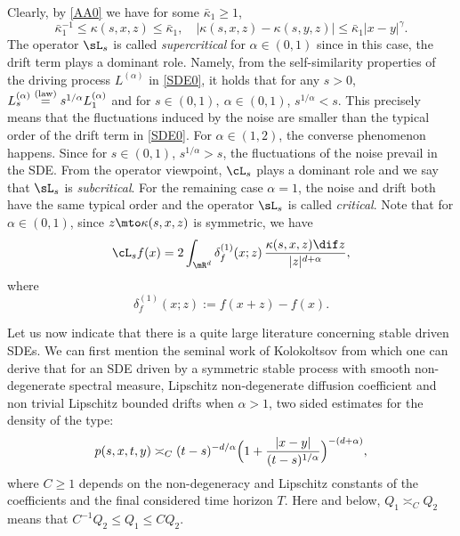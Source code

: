 Clearly, by \eqref{AA0} we have for some $\bar\kappa_1\geq 1$,
\begin{equation}\label{AA2}
\bar\kappa^{-1}_1\leq \kappa(s,x,z)\leq\bar\kappa_1,\quad |\kappa(s,x,z)-\kappa(s,y,z)|\leq\bar\kappa_1|x-y|^{\gamma}.
\end{equation}
The operator $\sL_{s}$ is called \textit{supercritical} for $\alpha\in(0,1)$ since in this case, the drift term plays a dominant role. Namely, from the self-similarity properties of the driving process $L^{(\alpha)}$ in \eqref{SDE0}, it holds that for any $s>0$, $L_s^{(\alpha)} \overset{({\rm law})}{=} s^{1/\alpha}L_1^{(\alpha)} $ and for $s\in (0,1),\ \alpha\in (0,1)$, $s^{1/\alpha}< s $. This precisely means that the fluctuations induced by the noise are smaller than the typical order of the drift term in \eqref{SDE0}.
For $\alpha\in(1,2)$, the converse phenomenon happens. Since for $s\in (0,1) $, $s^{1/\alpha}>s $, the fluctuations of the noise prevail in the SDE. From the operator viewpoint, $\cL_{s}$ plays a dominant role and we say that $\sL_{s}$ is \textit{subcritical}. For the remaining case $\alpha=1$, the noise and drift both have the same typical order and the operator $\sL_{s}$ is called \textit{critical}.
Note that for $\alpha\in(0,1)$, since $z\mto\kappa(s,x,z)$ is symmetric, we have
\[
\cL_{s} f(x)=2\int_{\mR^d}\delta^{(1)}_f(x;z)\,\frac{\kappa(s,x,z)\dif z}{|z|^{d+\alpha}},
\]
where
\[
\delta^{(1)}_f(x;z):=f(x+z)-f(x).
\]

Let us now indicate that there is a quite large literature concerning stable driven SDEs. We can first mention the seminal work of Kolokoltsov \cite{kolo:00} {from which one can derive} that for an SDE driven by a symmetric stable process with smooth non-degenerate spectral measure, Lipschitz non-degenerate diffusion coefficient and non trivial Lipschitz bounded drifts when $\alpha>1 $, two sided estimates for the density of the type:
\begin{equation}\label{FIRST_TW}
p(s,x,t,y)\asymp_C (t-s)^{-d/\alpha} \Bigl(1+\frac{|x-y|}{(t-s)^{1/\alpha}}\Bigr)^{-(d+\alpha)},
\end{equation}
where $C\ge 1$ depends on the non-degeneracy and Lipschitz constants of the coefficients and the final considered time horizon $T$.
Here and below, $Q_1\asymp_C Q_2$ means that $C^{-1}Q_2\leq Q_1\leq C Q_2$.

